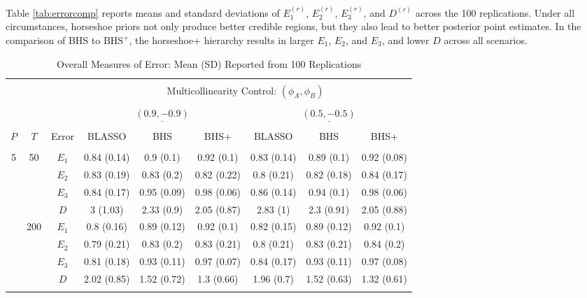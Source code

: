 Table \ref{tab:errorcomp} reports means and standard deviations of $E^{(r)}_1$, $E^{(r)}_2$, $E^{(r)}_3$, and $D^{(r)}$ across the 100 replications. Under all circumstances, horseshoe priors not only produce better credible regions, but they also lead to better posterior point estimates. In the comparison of BHS to $\textrm{BHS}^+$, the horseshoe+ hierarchy  results in larger $E_1$, $E_2$, and $E_3$, and lower $D$ across all scenarios. 
\begin{table}[htbp]
\scriptsize
\centering
\caption{Overall Measures of Error: Mean (SD) Reported from 100 Replications}
\begin{tabular}{ccc|ccc|ccc}
  \hline
  \multicolumn{3}{c|}{} & \multicolumn{6}{c}{} \\ 
  & & & & \multicolumn{4}{c}{Multicollinearity Control: $(\phi_A,\phi_B)$} &  \\
  \multicolumn{3}{c|}{} & \multicolumn{6}{c}{} \\ 
   &  & & \multicolumn{3}{c}{$\underline{(0.9 ,-0.9)} $} & \multicolumn{3}{c}{$\underline{(0.5 ,-0.5)} $}   \\
 \multicolumn{3}{c|}{} & \multicolumn{6}{c}{} \\ 
 $P$ & $T$ & Error & BLASSO & BHS & BHS+ & BLASSO & BHS & BHS+ \\ 
  \hline
  \multicolumn{3}{c|}{} & \multicolumn{6}{c}{} \\ 
  \multirow{8}{*}{5} & \multirow{4}{*}{50} & $E_1$ & 0.84 (0.14) & 0.9 (0.1) & 0.92 (0.1) & 0.83 (0.14) & 0.89 (0.1) & 0.92 (0.08) \\ 
  & & $E_2$ & 0.83 (0.19) & 0.83 (0.2) & 0.82 (0.22) & 0.8 (0.21) & 0.82 (0.18) & 0.84 (0.17) \\ 
  & & $E_3$ & 0.84 (0.17) & 0.95 (0.09) & 0.98 (0.06) & 0.86 (0.14) & 0.94 (0.1) & 0.98 (0.06) \\ 
  & & $D$ & 3 (1.03) & 2.33 (0.9) & 2.05 (0.87) & 2.83 (1) & 2.3 (0.91) & 2.05 (0.88) \\ 
  & \multirow{4}{*}{200} & $E_1$ & 0.8 (0.16) & 0.89 (0.12) & 0.92 (0.1) & 0.82 (0.15) & 0.89 (0.12) & 0.92 (0.1) \\ 
  & & $E_2$ & 0.79 (0.21) & 0.83 (0.2) & 0.83 (0.21) & 0.8 (0.21) & 0.83 (0.21) & 0.84 (0.2) \\ 
  & & $E_3$ & 0.81 (0.18) & 0.93 (0.11) & 0.97 (0.07) & 0.84 (0.17) & 0.93 (0.11) & 0.97 (0.08) \\ 
  & & $D$ & 2.02 (0.85) & 1.52 (0.72) & 1.3 (0.66) & 1.96 (0.7) & 1.52 (0.63) & 1.32 (0.61) \\ 
  \multicolumn{3}{c|}{} & \multicolumn{6}{c}{} \\ 

\end{tabular}
\end{table}
